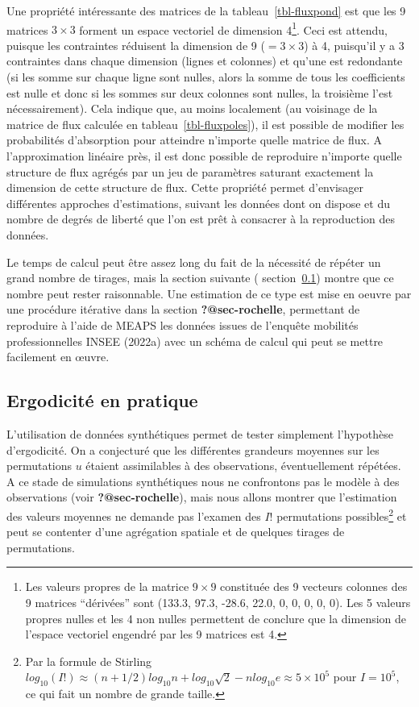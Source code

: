 \documentclass[
  10pt,
  a4paper,
  numbers=noendperiod,
  DIV=9]{scrreprt}
\begin{document}
Une propriété intéressante des matrices de la tableau~\ref{tbl-fluxpond}
est que les 9 matrices \(3 \times 3\) forment un espace vectoriel de
dimension 4\footnote{Les valeurs propres de la matrice \(9 \times 9\)
  constituée des 9 vecteurs colonnes des 9 matrices ``dérivées'' sont
  (133.3, 97.3, -28.6, 22.0, 0, 0, 0, 0, 0). Les 5 valeurs propres
  nulles et les 4 non nulles permettent de conclure que la dimension de
  l'espace vectoriel engendré par les 9 matrices est 4.}. Ceci est
attendu, puisque les contraintes réduisent la dimension de 9
(\(=3\times 3\)) à 4, puisqu'il y a 3 contraintes dans chaque dimension
(lignes et colonnes) et qu'une est redondante (si les somme sur chaque
ligne sont nulles, alors la somme de tous les coefficients est nulle et
donc si les sommes sur deux colonnes sont nulles, la troisième l'est
nécessairement). Cela indique que, au moins localement (au voisinage de
la matrice de flux calculée en tableau~\ref{tbl-fluxpoles}), il est
possible de modifier les probabilités d'absorption pour atteindre
n'importe quelle matrice de flux. A l'approximation linéaire près, il
est donc possible de reproduire n'importe quelle structure de flux
agrégés par un jeu de paramètres saturant exactement la dimension de
cette structure de flux. Cette propriété permet d'envisager différentes
approches d'estimations, suivant les données dont on dispose et du
nombre de degrés de liberté que l'on est prêt à consacrer à la
reproduction des données.

Le temps de calcul peut être assez long du fait de la nécessité de
répéter un grand nombre de tirages, mais la section suivante (
section~\ref{sec-ergemp}) montre que ce nombre peut rester raisonnable.
Une estimation de ce type est mise en oeuvre par une procédure itérative
dans la section \textbf{?@sec-rochelle}, permettant de reproduire à
l'aide de MEAPS les données issues de l'enquête mobilités
professionnelles INSEE (2022a) avec un schéma de calcul qui peut se
mettre facilement en œuvre.

\hypertarget{sec-ergemp}{%
\subsection{Ergodicité en pratique}\label{sec-ergemp}}

L'utilisation de données synthétiques permet de tester simplement
l'hypothèse d'ergodicité. On a conjecturé que les différentes grandeurs
moyennes sur les permutations \(u\) étaient assimilables à des
observations, éventuellement répétées. A ce stade de simulations
synthétiques nous ne confrontons pas le modèle à des observations (voir
\textbf{?@sec-rochelle}), mais nous allons montrer que l'estimation des
valeurs moyennes ne demande pas l'examen des \(I!\) permutations
possibles\footnote{Par la formule de Stirling
  \(log_{10}(I!) \approx (n +1/2)log_{10} n +log_{10}\sqrt{2} - n log_{10}e \approx 5\times10^5\)
  pour \(I=10^5\), ce qui fait un nombre de grande taille.} et peut se
contenter d'une agrégation spatiale et de quelques tirages de
permutations.
\end{document}
